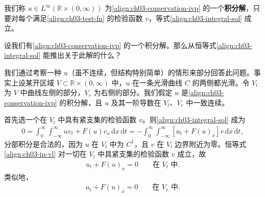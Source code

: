 \documentclass[../../main.tex]{subfiles}
\begin{document}
\begin{definition}\label{definition:ch03-integral-sol}
我们称 $u\in L^\infty(\mathbb{R}\times(0,\infty))$ 为\eqref{align:ch03-conservation-ivp} 的一个\textbf{积分解}，只要对每个满足\eqref{align:ch03-test-fn} 的检验函数 $v$，等式\eqref{align:ch03-integral-sol} 成立。
\end{definition}

设我们有\eqref{align:ch03-conservation-ivp} 的一个积分解。那么从恒等式\eqref{align:ch03-integral-sol} 能推出关于此解的什么？

我们通过考察一种 $u$（虽不连续，但结构特别简单）的情形来部分回答此问题。事实上设某开区域 $V\subset\mathbb{R}\times(0,\infty)$ 中，$u$ 在一条光滑曲线 $C$ 的两侧都光滑。令 $V_l$ 为 $V$ 中曲线左侧的部分，$V_r$ 为右侧的部分。我们假定 $u$ 是\eqref{align:ch03-conservation-ivp} 的积分解，且 $u$ 及其一阶导数在 $V_l$、$V_r$ 中一致连续。

首先选一个在 $V_l$ 中具有紧支集的检验函数 $v$。则\eqref{align:ch03-integral-sol} 成为
\begin{align}\label{align:ch03-in-vl}
0=\int_0^\infty\int_{-\infty}^{\infty}uv_t+F(u)v_x\,\mathrm{d}x\,\mathrm{d}t=-\int_0^\infty\int_{-\infty}^{\infty}[u_t+F(u)_x]v\,\mathrm{d}x\,\mathrm{d}t,
\end{align}
分部积分是合法的，因为 $u$ 在 $V_l$ 中为 $C^1$，且 $v$ 在 $V_l$ 边界附近为零。恒等式\eqref{align:ch03-in-vl} 对一切在 $V_l$ 中具紧支集的检验函数 $v$ 成立，故
\begin{align}\label{align:ch03-pde-vl}
u_t+F(u)_x=0 \qquad \text{在 }V_l\text{ 中}.
\end{align}
类似地，
\begin{align}\label{align:ch03-pde-vr}
u_t+F(u)_x=0 \qquad \text{在 }V_r\text{ 中}.
\end{align}
\end{document}
